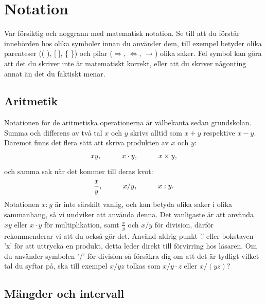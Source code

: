 \documentclass[titlepage]{article}
\begin{document}


\section{Notation}\label{ch3}

Var försiktig och noggrann med matematisk notation. Se till att du förstår innebörden hos olika symboler innan du använder dem, till exempel betyder olika parenteser (( ), [ ], \{ \}) och pilar ($\Rightarrow$, $\Leftrightarrow$, $\to$) olika saker. Fel symbol kan göra att det du skriver inte är matematiskt korrekt, eller att du skriver någonting annat än det du faktiskt menar.




\subsection{Aritmetik}

Notationen för de aritmetiska operationerna är välbekanta sedan grundskolan. Summa och differens av två tal $x$ och $y$ skrivs alltid som $x+y$ respektive $x-y$. Däremot finns det flera sätt att skriva produkten av $x$ och $y$:
$$xy, \hspace{10mm} x\cdot y, \hspace{10mm} x \times y,$$
och samma sak när det kommer till deras kvot:
$$\frac{x}{y}, \hspace{10mm} x/y, \hspace{10mm}  x : y.$$
Notationen $x:y$ är inte särskilt vanlig, och kan betyda olika saker i olika sammanhang, så vi undviker att använda denna. Det vanligaste är att använda $xy$ eller $x \cdot y$ för multiplikation, samt $\frac{x}{y}$ och $x/y$ för division, därför rekommenderar vi att du också gör det. Använd aldrig punkt '.' eller bokstaven 'x' för att uttrycka en produkt, detta leder direkt till förvirring hos läsaren. Om du använder symbolen '/' för division så försäkra dig om att det är tydligt vilket tal du syftar på, ska till exempel $x/yz$ tolkas som $x/y\cdot z$ eller $x/(yz)$?





\subsection{Mängder och intervall}
\end{document}

